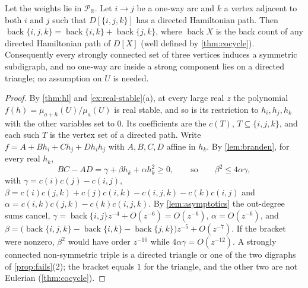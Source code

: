 \documentclass[final]{siamart0516}
\numberwithin{theorem}{section}
\numberwithin{equation}{section}
\theoremstyle{siamnonum}
\theoremstyle{plain}
\newcommand{\RR}{\mathbb{R}}
\newcommand{\Puis}{\mathcal{P}_{\RR}}
\newcommand{\back}{\operatorname{back}}
\begin{document}
\begin{corollary}\label{cor:triangles}
Let the weights lie in $\Puis$. Let $i\to j$ be a one-way arc and $k$ a vertex adjacent to both $i$ and $j$ such that $D[\{i,j,k\}]$ has a directed Hamiltonian path. Then $\back\{i,j,k\}=\back\{i,k\}+\back\{j,k\}$, where $\back X$ is the back count of any directed Hamiltonian path of $D[X]$ \textup{(}well defined by \cref{thm:cocycle}\textup{)}. Consequently every strongly connected set of three vertices induces a symmetric subdigraph, and no one-way arc inside a strong component lies on a directed triangle; no assumption on $U$ is needed.
\end{corollary}
\begin{proof}
By \cref{thm:hl} and \cref{ex:real-stable}(a), at every large real $z$ the polynomial $f(h)=\mu_{a+h}(U)/\mu_a(U)$ is real stable, and so is its restriction to $h_i,h_j,h_k$ with the other variables set to $0$. Its coefficients are the $c(T)$, $T\subseteq\{i,j,k\}$, and each such $T$ is the vertex set of a directed path. Write $f=A+Bh_i+Ch_j+Dh_ih_j$ with $A,B,C,D$ affine in $h_k$. By \cref{lem:branden}, for every real $h_k$,
\[
BC-AD=\gamma+\beta h_k+\alpha h_k^{2}\ge0,\qquad\text{so}\qquad \beta^{2}\le4\alpha\gamma,
\]
with $\gamma=c(i)c(j)-c(i,j)$, $\beta=c(i)c(j,k)+c(j)c(i,k)-c(i,j,k)-c(k)c(i,j)$ and $\alpha=c(i,k)c(j,k)-c(k)c(i,j,k)$. By \cref{lem:asymptotics} the out-degree sums cancel, $\gamma=\back\{i,j\}z^{-4}+O(z^{-6})=O(z^{-6})$, $\alpha=O(z^{-6})$, and $\beta=\bigl(\back\{i,j,k\}-\back\{i,k\}-\back\{j,k\}\bigr)z^{-5}+O(z^{-7})$. If the bracket were nonzero, $\beta^2$ would have order $z^{-10}$ while $4\alpha\gamma=O(z^{-12})$. A strongly connected non-symmetric triple is a directed triangle or one of the two digraphs of \cref{prop:fails}(2); the bracket equals $1$ for the triangle, and the other two are not Eulerian (\cref{thm:cocycle}).
\end{proof}
\end{document}
